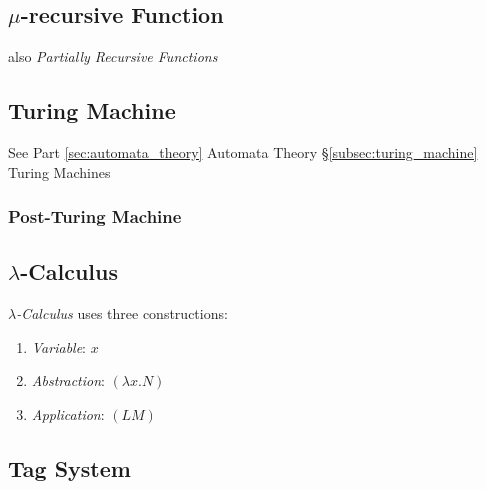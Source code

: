 \documentclass{article}
\begin{document}
\subsection{$\mu$-recursive Function}\label{subsec:mu_recursive}

also \emph{Partially Recursive Functions}

\subsection{Turing Machine}

See Part \ref{sec:automata_theory} Automata Theory
\S\ref{subsec:turing_machine} Turing Machines

\subsubsection{Post-Turing Machine}\label{subsec:post_turing}



\subsection{$\lambda$-Calculus}\label{subsec:lambda_calculus}

\emph{$\lambda$-Calculus} uses three constructions:

\begin{enumerate}
    \item \emph{Variable}: $x$
    \item \emph{Abstraction}: $(\lambda x.N)$
    \item \emph{Application}: $(L M)$
\end{enumerate}



\subsection{Tag System}\label{subsec:tag_system}
\end{document}
